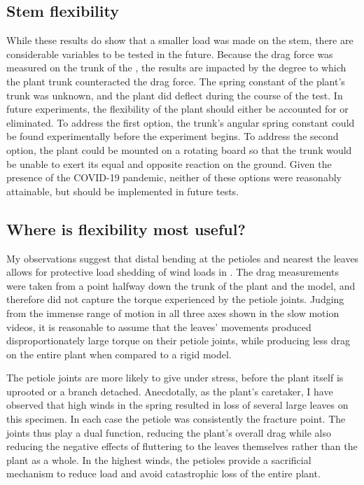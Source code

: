 \subsection{Stem flexibility}
While these results do show that a smaller load was made on the stem, there are considerable variables to be tested in the future. Because the drag force was measured on the trunk of the \Cxparadisi, the results are impacted by the degree to which the plant trunk counteracted the drag force. The spring constant of the plant's trunk was unknown, and the plant did deflect during the course of the test. In future experiments, the flexibility of the plant should either be accounted for or eliminated. To address the first option, the trunk's angular spring constant could be found experimentally before the experiment begins. To address the second option, the plant could be mounted on a rotating board so that the trunk would be unable to exert its equal and opposite reaction on the ground. Given the presence of the COVID-19 pandemic, neither of these options were reasonably attainable, but should be implemented in future tests.

\subsection{Where is flexibility most useful?}
My observations suggest that distal bending at the petioles and nearest the leaves allows for protective load shedding of wind loads in \Cxparadisi. The drag measurements were taken from a point halfway down the trunk of the plant and the model, and therefore did not capture the torque experienced by the petiole joints. Judging from the immense range of motion in all three axes shown in the slow motion videos, it is reasonable to assume that the leaves' movements produced disproportionately large torque on their petiole joints, while producing less drag on the entire plant when compared to a rigid model. 

The petiole joints are more likely to give under stress, before the plant itself is uprooted or a branch detached. Anecdotally, as the plant's caretaker, I have observed that high winds in the spring resulted in loss of several large leaves on this specimen. In each case the petiole was consistently the fracture point. The joints thus play a dual function, reducing the plant's overall drag while also reducing the negative effects of fluttering to the leaves themselves rather than the plant as a whole. In the highest winds, the petioles provide a sacrificial mechanism to reduce load and avoid catastrophic loss of the entire plant. 


